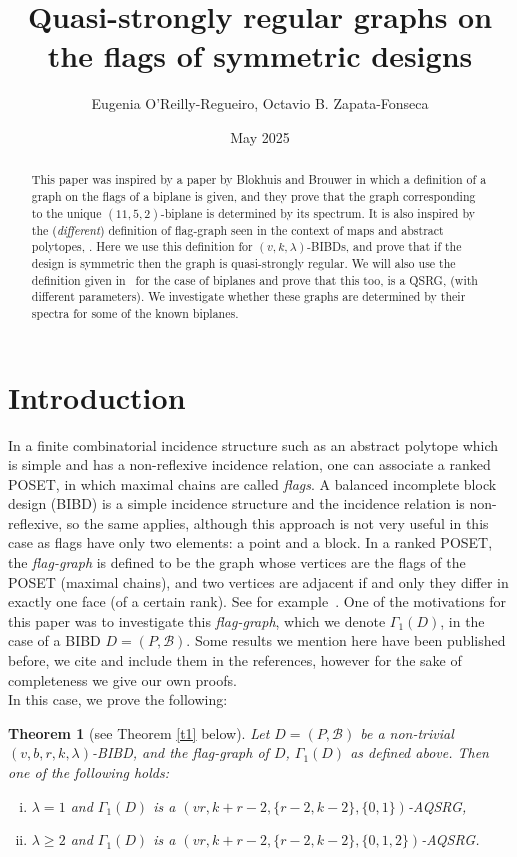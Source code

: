 \documentclass[letterpaper,10pt]{article}
\title{Quasi-strongly regular graphs on the flags of symmetric designs}%
\author{Eugenia O'Reilly-Regueiro, Octavio B. Zapata-Fonseca}
\date{May 2025}
\theoremstyle{plain}
\newtheorem*{thm*}{Theorem}
\theoremstyle{definition}
\begin{document}
\maketitle

\begin{abstract}
    This paper was inspired by a paper by Blokhuis and Brouwer \cite{BB} in which a definition of a graph on the flags of a biplane is given, and they prove that the graph corresponding to the unique $(11,5,2)$-biplane is determined by its spectrum. It is also inspired by the (\emph{different}) definition of flag-graph seen in the context of maps and abstract polytopes, \cite{Cu,Hu}. Here we use this definition for $(v,k,\lambda)$-BIBDs, and prove that if the design is symmetric then the graph is quasi-strongly regular. We will also use the definition given in~\cite{BB} for the case of biplanes and prove that this too, is a QSRG, (with different parameters). We investigate whether these graphs are determined by their spectra for some of the known biplanes.
\end{abstract}


\section{Introduction}
In a finite combinatorial incidence structure such as an abstract polytope which is simple and has a non-reflexive incidence relation, one can associate a ranked POSET, in which maximal chains are called {\em{flags}}. A balanced incomplete block design (BIBD) is a simple incidence structure and the incidence relation is non-reflexive, so the same applies, although this approach is not very useful in this case as flags have only two elements: a point and a block. In a ranked POSET, the {\em{flag-graph}} is defined to be the graph whose vertices are the flags of the POSET (maximal chains), and two vertices are adjacent if and only they differ in exactly one face (of a certain rank). See for example~\cite{Cu, Hu}. One of the motivations for this paper was to investigate this {\em{flag-graph}}, which we denote $\Gamma_1(D)$, in the case of a BIBD $D=(P,\mathcal{B})$. Some results we mention here have been published before, we cite and include them in the references, however for the sake of completeness we give our own proofs.\\

In this case, we prove the following:

\begin{thm*}[see Theorem \ref{t1} below]
     Let $D=(P,\mathcal{B})$ be a non-trivial $(v,b,r,k,\lambda)$-BIBD, and the flag-graph of $D$, $\Gamma_1(D)$ as defined above. Then one of the following holds:
     \begin{enumerate}[(i)]
         \item\label{t1i} $\lambda=1$ and $\Gamma_1(D)$ is a $(vr,k+r-2,\{r-2,k-2\},\{0,1\})$-AQSRG,
         \item $\lambda\geq 2$ and $\Gamma_1(D)$ is a $(vr,k+r-2,\{r-2,k-2\},\{0,1,2\})$-AQSRG.
     \end{enumerate}
 \end{thm*}
\end{document}
